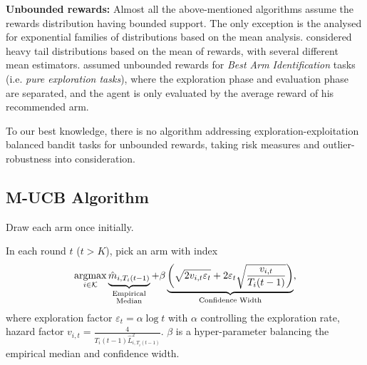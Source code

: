 \textbf{Unbounded rewards:}
Almost all the above-mentioned algorithms assume the rewards distribution having bounded support. The only exception is the \textcite{garivier2011kl} analysed for exponential families of distributions based on the mean analysis. \textcite{bubeck2013bandits} considered heavy tail distributions based on the mean of rewards, with several different mean estimators.
\textcite{yu2018pure, kagrecha2019distribution} assumed unbounded rewards for \textit{Best Arm Identification} tasks (i.e. \textit{pure exploration tasks}), where the exploration phase and evaluation phase are separated, and the agent is only evaluated by the average reward of his recommended arm.

To our best knowledge, there is no algorithm addressing exploration-exploitation balanced bandit tasks for unbounded rewards, taking risk measures and outlier-robustness into consideration.



\subsection{M-UCB Algorithm}
\label{sec: policy}


\begin{algorithm}[t]
\caption{\ourpolicy}
\label{alg:Policy for IHR distributions}
\begin{algorithmic}
    \STATE Draw each arm once initially.

    \STATE In each round ${t}$ ($t > K$), pick an arm with index
    \STATE
    \begin{align*}
        \operatorname*{argmax}_{i \in \mathcal{K}} \underbrace{\hat{m}_{i, T_i(t-1)}}_{\substack{\text{Empirical} \\ \text{Median}}} + \beta  \underbrace{\left(\sqrt{2v_{i,t} \varepsilon_t} + 2 \varepsilon_t \sqrt{\frac{v_{i,t}}{T_i(t-1)}}\right)}_{\text{Confidence Width}},
    \end{align*}
    \STATE where
    exploration factor $\varepsilon_t = \alpha \log t$ with $\alpha$ controlling the exploration rate, hazard factor $v_{i,t} = \frac{4 }{T_i(t-1) \hat{L}_{i,T_i(t-1)}^2}$.
    $\beta$ is a hyper-parameter balancing the empirical median and confidence width.
\end{algorithmic}
\end{algorithm}

